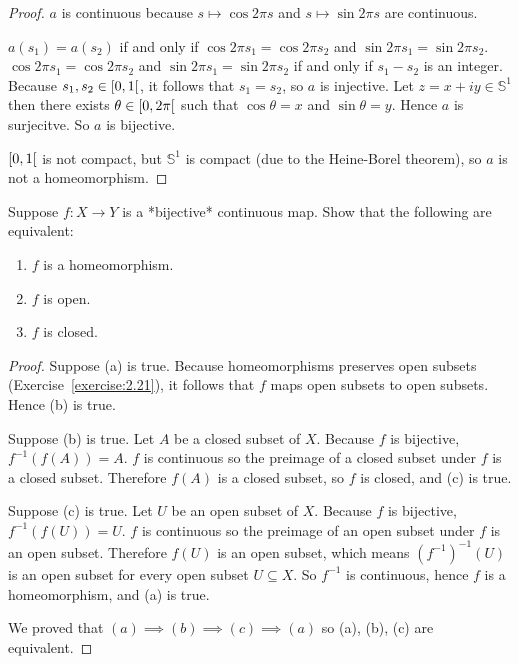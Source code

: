 \begin{proof}
	$a$ is continuous because $s\mapsto \cos 2\pi s$ and $s\mapsto \sin 2\pi s$ are continuous.

	$a(s_{1}) = a(s_{2})$ if and only if $\cos 2\pi s_{1} = \cos 2\pi s_{2}$ and $\sin 2\pi s_{1} = \sin 2\pi s_{2}$. $\cos 2\pi s_{1} = \cos 2\pi s_{2}$ and $\sin 2\pi s_{1} = \sin 2\pi s_{2}$ if and only if $s_{1} - s_{2}$ is an integer. Because $s_{1}, s_{2}\in \left[{0,1}\right[$, it follows that $s_{1} = s_{2}$, so $a$ is injective. Let $z = x + i y\in \mathbb{S}^{1}$ then there exists $\theta\in\left[{0, 2\pi}\right[$ such that $\cos\theta = x$ and $\sin\theta = y$. Hence $a$ is surjecitve. So $a$ is bijective.

	$\left[{0, 1}\right[$ is not compact, but $\mathbb{S}^{1}$ is compact (due to the Heine-Borel theorem), so $a$ is not a homeomorphism.
\end{proof}

\begin{exercise}{2.29}\label{exercise2.29}
	Suppose $f: X\to Y$ is a *bijective* continuous map. Show that the following are equivalent:

	\begin{enumerate}[label={(\alph*)}]
		\item $f$ is a homeomorphism.
		\item $f$ is open.
		\item $f$ is closed.
	\end{enumerate}
\end{exercise}

\begin{proof}
	Suppose (a) is true. Because homeomorphisms preserves open subsets (Exercise~\ref{exercise:2.21}), it follows that $f$ maps open subsets to open subsets. Hence (b) is true.

	Suppose (b) is true. Let $A$ be a closed subset of $X$. Because $f$ is bijective, $f^{-1}(f(A)) = A$. $f$ is continuous so the preimage of a closed subset under $f$ is a closed subset. Therefore $f(A)$ is a closed subset, so $f$ is closed, and (c) is true.

	Suppose (c) is true. Let $U$ be an open subset of $X$. Because $f$ is bijective, $f^{-1}(f(U)) = U$. $f$ is continuous so the preimage of an open subset under $f$ is an open subset. Therefore $f(U)$ is an open subset, which means ${(f^{-1})}^{-1}(U)$ is an open subset for every open subset $U\subseteq X$. So $f^{-1}$ is continuous, hence $f$ is a homeomorphism, and (a) is true.

	We proved that $(a)\implies (b) \implies (c) \implies (a)$ so (a), (b), (c) are equivalent.
\end{proof}

